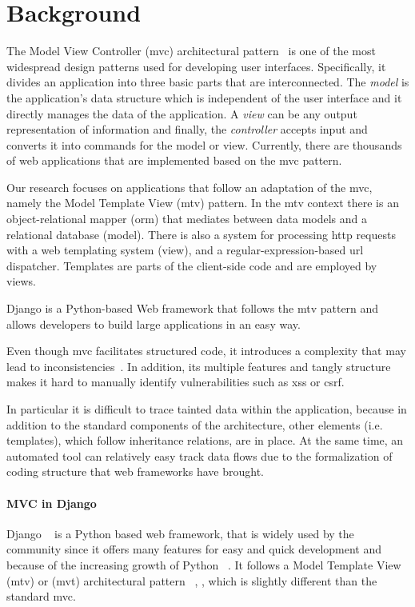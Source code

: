 \section{Background}
\label{sec:background}

The Model View Controller 
({\sc mvc}) architectural
pattern~\cite{GLH03, BD04}
is one of the most widespread design
patterns used for developing user interfaces. Specifically,
it divides an application into three
basic parts that are interconnected.
The {\it model} is the application's
data structure which is independent
of the user interface and it directly
manages the data of the application.
A {\it view} can be any output
representation of information and finally,
the {\it controller}
accepts input and converts it into
commands for the model or view.
Currently,
there are thousands of web applications
that are implemented based on the {\sc mvc}
pattern.

Our research focuses on applications
that follow an adaptation of the
{\sc mvc},
namely the Model Template
View ({\sc mtv}) pattern.
In the {\sc mtv} context
there is an object-relational mapper
({\sc orm}) that mediates between data models
and a relational database (model).
There is also a system for
processing {\sc http} requests with
a web templating system (view),
and a regular-expression-based
{\sc url} dispatcher.
Templates are parts of the
client-side code and are employed by views.

Django is a Python-based Web framework
that follows the {\sc mtv} pattern
and allows developers to build
large applications in an easy way.

Even though {\sc mvc} facilitates
structured code,
it introduces a complexity that
may lead to inconsistencies~\cite{OPM15}.
In addition,
its multiple features and tangly
structure makes it hard to manually
identify vulnerabilities such as
{\sc xss} or {\sc csrf}.
 
In particular it is difficult to trace tainted data within the 
application, because in addition to the standard components of 
the architecture, other elements (i.e. templates), which follow 
inheritance relations, are in place. 
At the same time, an automated tool can relatively easy track 
data  flows due to the formalization of coding structure that 
web frameworks have brought. 

\paragraph{MVC in Django}
Django ~\cite{django} is a Python based web framework, that is 
widely used by the community since it offers many features
for easy and quick development and because of the  
increasing growth of Python ~\cite{python_trend}.
It follows a Model Template View ({\sc mtv}) or ({\sc mvt}) 
architectural pattern ~\cite{Holovaty:2009:DGD:1572516}, 
\cite{django_mvt}, which is slightly different than the 
standard {\sc mvc}. 

